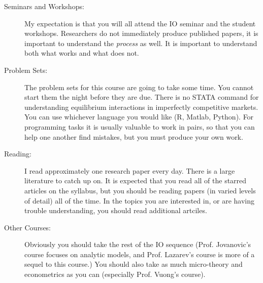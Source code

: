 \documentclass[11pt]{article}
\begin{document}
\begin{description}
\item[Seminars and Workshops:] My expectation is that you will all attend the IO seminar and the student workshops. Researchers do not immediately produce published papers, it is important to understand the \textit{process} as well. It is important to understand both what works and what does not.
\item[Problem Sets:] The problem sets for this course are going to take some time. You cannot start them the night before they are due. There is no STATA command for understanding equilibrium interactions in imperfectly competitive markets. You can use whichever language you would like (R, Matlab, Python). For programming tasks it is usually valuable to work in pairs, so that you can help one another find mistakes, but you must produce your own work. 
\item[Reading:] I read approximately one research paper every day. There is a large literature to catch up on. It is expected that you read all of the starred articles on the syllabus, but you should be reading papers (in varied levels of detail) all of the time. In the topics you are interested in, or are having trouble understanding, you should read additional artciles.
\item[Other Courses:] Obviously you should take the rest of the IO sequence (Prof. Jovanovic's course focuses on analytic models, and Prof. Lazarev's course is more of a sequel to this course.) You should also take as much micro-theory and econometrics as you can (especially Prof. Vuong's course).
\end{description}
\end{document}
